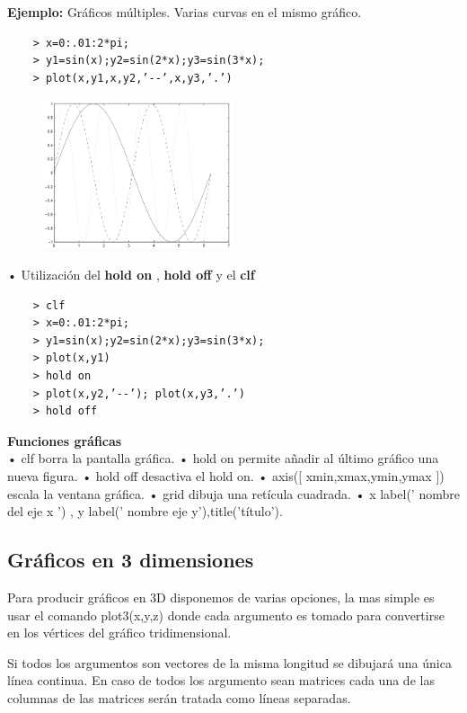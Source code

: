 \documentclass[a4,12pt]{article}
\begin{document}
\textbf{Ejemplo:} Gráficos múltiples. Varias curvas en el mismo gráfico.\\
\begin{verbatim}
    > x=0:.01:2*pi;
    > y1=sin(x);y2=sin(2*x);y3=sin(3*x);
    > plot(x,y1,x,y2,’--’,x,y3,’.’)
\end{verbatim}

\begin{figure}[H]
  \centering
    \includegraphics[width=0.5\textwidth]{graficos/imagen7}
\end{figure}

• Utilización del \textbf{hold on} , \textbf{hold off} y el \textbf{clf}\\
\begin{verbatim}
    > clf
    > x=0:.01:2*pi;
    > y1=sin(x);y2=sin(2*x);y3=sin(3*x);
    > plot(x,y1)
    > hold on
    > plot(x,y2,’--’); plot(x,y3,’.’)
    > hold off
\end{verbatim}
\textbf{Funciones gráficas}\\
• clf borra la pantalla gráfica.
• hold on permite añadir al último gráfico una nueva figura.
• hold off desactiva el hold on.
• axis([ xmin,xmax,ymin,ymax ]) escala la ventana gráfica.
• grid dibuja una retícula cuadrada.
• x label(’ nombre del eje x ’) , y label(’ nombre eje y’),title(’título’).

\subsection{Gráficos en 3 dimensiones}

Para producir gráficos en 3D disponemos de varias opciones, la mas simple es usar el comando  plot3(x,y,z) donde cada argumento es tomado para convertirse en los vértices del gráfico tridimensional.

Si todos los argumentos son vectores de la misma longitud se dibujará una única línea continua. En caso de todos los argumento sean matrices cada una de las columnas de las matrices serán tratada como líneas separadas.
\end{document}
